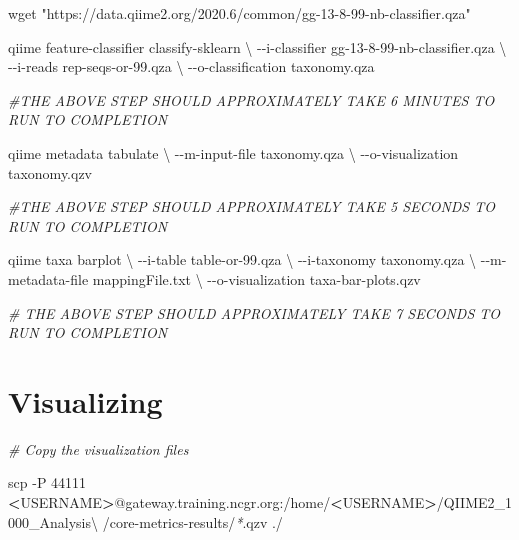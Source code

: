 \documentclass[
]{book}
\newenvironment{Shaded}{\begin{snugshade}}{\end{snugshade}}
\newcommand{\AttributeTok}[1]{\textcolor[rgb]{0.77,0.63,0.00}{#1}}
\newcommand{\CommentTok}[1]{\textcolor[rgb]{0.56,0.35,0.01}{\textit{#1}}}
\newcommand{\DataTypeTok}[1]{\textcolor[rgb]{0.13,0.29,0.53}{#1}}
\newcommand{\ExtensionTok}[1]{#1}
\newcommand{\FunctionTok}[1]{\textcolor[rgb]{0.00,0.00,0.00}{#1}}
\newcommand{\NormalTok}[1]{#1}
\newcommand{\OperatorTok}[1]{\textcolor[rgb]{0.81,0.36,0.00}{\textbf{#1}}}
\newcommand{\PreprocessorTok}[1]{\textcolor[rgb]{0.56,0.35,0.01}{\textit{#1}}}
\newcommand{\StringTok}[1]{\textcolor[rgb]{0.31,0.60,0.02}{#1}}
\begin{document}
\begin{Shaded}
\begin{Highlighting}[]

\FunctionTok{wget} \StringTok{"https://data.qiime2.org/2020.6/common/gg{-}13{-}8{-}99{-}nb{-}classifier.qza"}

\ExtensionTok{qiime}\NormalTok{ feature{-}classifier classify{-}sklearn }\DataTypeTok{\textbackslash{}}
\NormalTok{{-}{-}i{-}classifier gg{-}13{-}8{-}99{-}nb{-}classifier.qza }\DataTypeTok{\textbackslash{}}
\NormalTok{{-}{-}i{-}reads rep{-}seqs{-}or{-}99.qza }\DataTypeTok{\textbackslash{}}
\NormalTok{{-}{-}o{-}classification taxonomy.qza}

\CommentTok{\#THE ABOVE STEP SHOULD APPROXIMATELY TAKE 6 MINUTES TO RUN TO COMPLETION}

\ExtensionTok{qiime}\NormalTok{ metadata tabulate }\DataTypeTok{\textbackslash{}}
\NormalTok{{-}{-}m{-}input{-}file taxonomy.qza }\DataTypeTok{\textbackslash{}}
\NormalTok{{-}{-}o{-}visualization taxonomy.qzv}

\CommentTok{\#THE ABOVE STEP SHOULD APPROXIMATELY TAKE 5 SECONDS TO RUN TO COMPLETION}

\ExtensionTok{qiime}\NormalTok{ taxa barplot }\DataTypeTok{\textbackslash{}}
\NormalTok{{-}{-}i{-}table table{-}or{-}99.qza }\DataTypeTok{\textbackslash{}}
\NormalTok{{-}{-}i{-}taxonomy taxonomy.qza }\DataTypeTok{\textbackslash{}}
\NormalTok{{-}{-}m{-}metadata{-}file mappingFile.txt }\DataTypeTok{\textbackslash{}}
\NormalTok{{-}{-}o{-}visualization taxa{-}bar{-}plots.qzv}

\CommentTok{\# THE ABOVE STEP SHOULD APPROXIMATELY TAKE 7 SECONDS TO RUN TO COMPLETION}
\end{Highlighting}
\end{Shaded}

\hypertarget{visualizing}{%
\section{Visualizing}\label{visualizing}}

\begin{Shaded}
\begin{Highlighting}[]
\CommentTok{\# Copy the visualization files}

\FunctionTok{scp} \AttributeTok{{-}P}\NormalTok{ 44111 }\OperatorTok{\textless{}}\NormalTok{USERNAME}\OperatorTok{\textgreater{}}\NormalTok{@gateway.training.ncgr.org:/home/}\OperatorTok{\textless{}}\NormalTok{USERNAME}\OperatorTok{\textgreater{}}\NormalTok{/QIIME2\_1000\_Analysis}\DataTypeTok{\textbackslash{}}
\NormalTok{/core{-}metrics{-}results/}\PreprocessorTok{*}\NormalTok{.qzv ./}
\end{Highlighting}
\end{Shaded}
\end{document}
